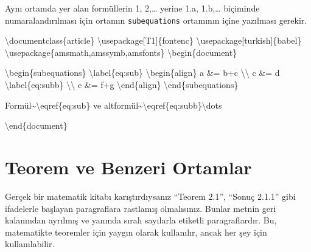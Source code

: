 \documentclass[
  letterpaper,
  DIV=11,
  numbers=noendperiod]{scrreprt}
\newenvironment{Shaded}{\begin{snugshade}}{\end{snugshade}}
\newcommand{\BuiltInTok}[1]{\textcolor[rgb]{0.00,0.23,0.31}{#1}}
\newcommand{\ExtensionTok}[1]{\textcolor[rgb]{0.00,0.23,0.31}{#1}}
\newcommand{\FunctionTok}[1]{\textcolor[rgb]{0.28,0.35,0.67}{#1}}
\newcommand{\KeywordTok}[1]{\textcolor[rgb]{0.00,0.23,0.31}{#1}}
\newcommand{\NormalTok}[1]{\textcolor[rgb]{0.00,0.23,0.31}{#1}}
\newcommand{\SpecialCharTok}[1]{\textcolor[rgb]{0.37,0.37,0.37}{#1}}
\newcommand{\SpecialStringTok}[1]{\textcolor[rgb]{0.13,0.47,0.30}{#1}}
\begin{document}
Aynı ortamda yer alan formüllerin 1, 2,\ldots{} yerine 1.a, 1.b,\ldots{}
biçiminde numaralandırılması için ortamın \texttt{subequations}
ortamının içine yazılması gerekir.

\begin{Shaded}
\begin{Highlighting}[]
\BuiltInTok{\textbackslash{}documentclass}\NormalTok{\{}\ExtensionTok{article}\NormalTok{\}}
\BuiltInTok{\textbackslash{}usepackage}\NormalTok{[T1]\{}\ExtensionTok{fontenc}\NormalTok{\}}
\BuiltInTok{\textbackslash{}usepackage}\NormalTok{[turkish]\{}\ExtensionTok{babel}\NormalTok{\}}
\BuiltInTok{\textbackslash{}usepackage}\NormalTok{\{}\ExtensionTok{amsmath,amssymb,amsfonts}\NormalTok{\}}
\KeywordTok{\textbackslash{}begin}\NormalTok{\{}\ExtensionTok{document}\NormalTok{\}}

\KeywordTok{\textbackslash{}begin}\NormalTok{\{}\ExtensionTok{subequations}\NormalTok{\}}
\KeywordTok{\textbackslash{}label}\NormalTok{\{}\ExtensionTok{eq:sub}\NormalTok{\}}
\KeywordTok{\textbackslash{}begin}\NormalTok{\{}\ExtensionTok{align}\NormalTok{\}}
\SpecialStringTok{ a \&= b+c }\SpecialCharTok{\textbackslash{}\textbackslash{}}
\SpecialStringTok{ c \&= d }\SpecialCharTok{\textbackslash{}label}\SpecialStringTok{\{eq:subb\} }\SpecialCharTok{\textbackslash{}\textbackslash{}}
\SpecialStringTok{ e \&= f+g}
\KeywordTok{\textbackslash{}end}\NormalTok{\{}\ExtensionTok{align}\NormalTok{\}}
\KeywordTok{\textbackslash{}end}\NormalTok{\{}\ExtensionTok{subequations}\NormalTok{\}}

\NormalTok{Formül\textasciitilde{}}\KeywordTok{\textbackslash{}eqref}\NormalTok{\{}\ExtensionTok{eq:sub}\NormalTok{\} ve}
\NormalTok{altformül\textasciitilde{}}\KeywordTok{\textbackslash{}eqref}\NormalTok{\{}\ExtensionTok{eq:subb}\NormalTok{\}}\FunctionTok{\textbackslash{}dots}

\KeywordTok{\textbackslash{}end}\NormalTok{\{}\ExtensionTok{document}\NormalTok{\}}
\end{Highlighting}
\end{Shaded}

\hypertarget{teorem-ve-benzeri-ortamlar}{%
\section{Teorem ve Benzeri Ortamlar}\label{teorem-ve-benzeri-ortamlar}}

Gerçek bir matematik kitabı karıştırdıysanız ``Teorem 2.1'', ``Sonuç
2.1.1'' gibi ifadelerle başlayan paragraflara rastlamış olmalısınız.
Bunlar metnin geri kalanından ayrılmış ve yanında sıralı sayılarla
etiketli paragraflardır. Bu, matematikte teoremler için yaygın olarak
kullanılır, ancak her şey için kullanılabilir.
\end{document}
